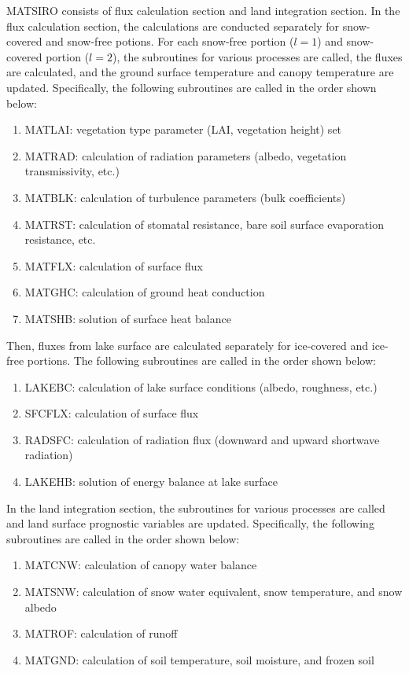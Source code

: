 MATSIRO consists of flux calculation section and land integration section. In the flux calculation section, the calculations are conducted separately for snow-covered and snow-free potions. For each
snow-free portion (\(l=1\)) and snow-covered portion (\(l=2\)), the subroutines for various processes are called, the fluxes are calculated, and the ground surface temperature and canopy temperature
are updated. Specifically, the following subroutines are called in the order shown below:

\begin{enumerate}
\def\labelenumi{(\alph{enumi})}
\tightlist
\item
  MATLAI: vegetation type parameter (LAI, vegetation height) set
\item
  MATRAD: calculation of radiation parameters (albedo, vegetation transmissivity, etc.)
\item
  MATBLK: calculation of turbulence parameters (bulk coefficients)
\item
  MATRST: calculation of stomatal resistance, bare soil surface evaporation resistance, etc.
\item
  MATFLX: calculation of surface flux
\item
  MATGHC: calculation of ground heat conduction
\item
  MATSHB: solution of surface heat balance
\end{enumerate}

Then, fluxes from lake surface are calculated separately for ice-covered and ice-free portions. The following subroutines are called in the order shown below:

\begin{enumerate}
\def\labelenumi{(\alph{enumi})}
\setcounter{enumi}{7}
\tightlist
\item
  LAKEBC: calculation of lake surface conditions (albedo, roughness, etc.)
\item
  SFCFLX: calculation of surface flux
\item
  RADSFC: calculation of radiation flux (downward and upward shortwave radiation)
\item
  LAKEHB: solution of energy balance at lake surface
\end{enumerate}

In the land integration section, the subroutines for various processes are called and land surface prognostic variables are updated. Specifically, the following subroutines are called in the order
shown below:

\begin{enumerate}
\def\labelenumi{(\alph{enumi})}
\setcounter{enumi}{11}
\tightlist
\item
  MATCNW: calculation of canopy water balance
\item
  MATSNW: calculation of snow water equivalent, snow temperature, and snow albedo
\item
  MATROF: calculation of runoff
\item
  MATGND: calculation of soil temperature, soil moisture, and frozen soil
\end{enumerate}

